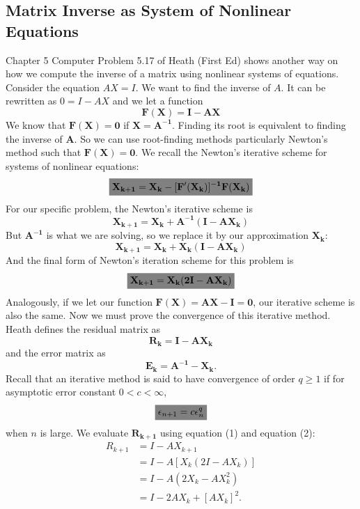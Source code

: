 \documentclass[a4paper]{article}
\newcommand{\highlight}[1]{\colorbox{gray}{$\displaystyle#1$}}
\begin{document}
		\subsection{Matrix Inverse as System of Nonlinear Equations}
			Chapter 5 Computer Problem 5.17 of Heath (First Ed) shows another way on how we compute the inverse of a matrix using nonlinear systems of equations.
			Consider the equation $AX=I$. We want to find the inverse of $A$.
			It can be rewritten as $0=I-AX$ and we let a function $$\mathbf{F(X)=I-AX}$$
			We know that $\mathbf{F(X)=0}$ if $\mathbf{X=A^{-1}}$. Finding its root is equivalent to finding the inverse of $\mathbf{A}$.
			So we can use root-finding methods particularly Newton's method such that $\mathbf{F(X)=0}$. We recall the Newton's iterative scheme for systems of nonlinear equations:
			$$\highlight{
			\mathbf{
				X_{k+1}=X_{k}-[F'(X_{k})]^{-1}F(X_{k})
			}}
			$$
			For our specific problem, the Newton's iterative scheme is
			$$
			\mathbf{
				X_{k+1}=X_{k}+A^{-1}(I-AX_{k})
			}
			$$
			But $\mathbf{A^{-1}}$ is what we are solving, so we replace it by our approximation $\mathbf{X_{k}}$:
			$$
				\mathbf{X_{k+1}=X_{k}+X_{k}(I-AX_{k})}
			$$
			And the final form of Newton's iteration scheme for this problem is
			\begin{equation}\highlight{
				\mathbf{X_{k+1}=X_{k}(2I-AX_{k})}
			}\end{equation}
			Analogously, if we let our function $\mathbf{F(X)=AX-I=0}$, our iterative scheme is also the same.
			Now we must prove the convergence of this iterative method.
			Heath defines the residual matrix as
			\begin{equation}
				\mathbf{R_{k}=I-AX_{k}}
			\end{equation}
			and the error matrix as
			\begin{equation}
				\mathbf{E_{k}=A^{-1}-X_{k}}.
			\end{equation}
			Recall that an iterative method is said to have convergence of order $q\geq1$ if for asymptotic error constant $0<c<\infty$,
			$$\highlight{
				\epsilon_{n+1}=c\epsilon_{n}^{q}
			}$$
			when $n$ is large.
			We evaluate $\mathbf{R_{k+1}}$ using equation (1) and equation (2):
			$$
			\begin{aligned}
					R_{k+1}&=I-AX_{k+1}\\
					&=I-A[X_{k}(2I-AX_{k})]\\
					&=I-A(2X_{k}-AX^{2}_{k})\\
					&=I-2AX_{k}+[AX_{k}]^{2}.
			\end{aligned}
			$$
\end{document}
